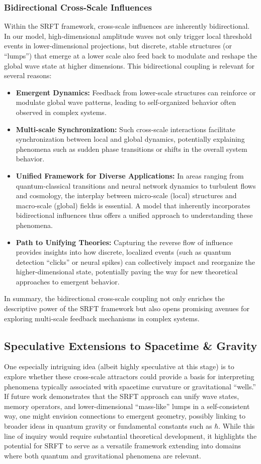 \documentclass[12pt]{article}
\begin{document}
\subsubsection{Bidirectional Cross-Scale Influences}
Within the SRFT framework, cross-scale influences are inherently bidirectional. In our model, high-dimensional amplitude waves not only trigger local threshold events in lower-dimensional projections, but discrete, stable structures (or “lumps”) that emerge at a lower scale also feed back to modulate and reshape the global wave state at higher dimensions. This bidirectional coupling is relevant for several reasons:
\begin{itemize}
    \item \textbf{Emergent Dynamics:} Feedback from lower-scale structures can reinforce or modulate global wave patterns, leading to self-organized behavior often observed in complex systems.
    \item \textbf{Multi-scale Synchronization:} Such cross-scale interactions facilitate synchronization between local and global dynamics, potentially explaining phenomena such as sudden phase transitions or shifts in the overall system behavior.
    \item \textbf{Unified Framework for Diverse Applications:} In areas ranging from quantum-classical transitions and neural network dynamics to turbulent flows and cosmology, the interplay between micro-scale (local) structures and macro-scale (global) fields is essential. A model that inherently incorporates bidirectional influences thus offers a unified approach to understanding these phenomena.
    \item \textbf{Path to Unifying Theories:} Capturing the reverse flow of influence provides insights into how discrete, localized events (such as quantum detection “clicks” or neural spikes) can collectively impact and reorganize the higher-dimensional state, potentially paving the way for new theoretical approaches to emergent behavior.
\end{itemize}
In summary, the bidirectional cross-scale coupling not only enriches the descriptive power of the SRFT framework but also opens promising avenues for exploring multi-scale feedback mechanisms in complex systems.


\subsection{Speculative Extensions to Spacetime \& Gravity}
One especially intriguing idea (albeit highly speculative at this stage) is to explore whether these cross-scale attractors could provide a basis for interpreting phenomena typically associated with spacetime curvature or gravitational “wells.” If future work demonstrates that the SRFT approach can unify wave states, memory operators, and lower-dimensional “mass-like” lumps in a self-consistent way, one might envision connections to emergent geometry, possibly linking to broader ideas in quantum gravity or fundamental constants such as $\hbar$. While this line of inquiry would require substantial theoretical development, it highlights the potential for SRFT to serve as a versatile framework extending into domains where both quantum and gravitational phenomena are relevant.
\end{document}
